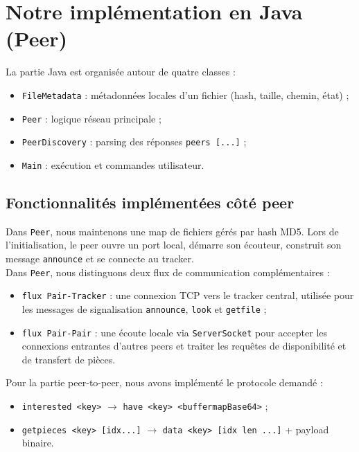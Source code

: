 \documentclass[12pt,a4paper]{article}
\begin{document}
\section{Notre implémentation en Java (Peer)}

La partie Java est organisée autour de quatre classes :
\begin{itemize}[leftmargin=1.2cm]
  \item \texttt{FileMetadata} : métadonnées locales d’un fichier (hash, taille, chemin, état) ;
  \item \texttt{Peer} : logique réseau principale ;
  \item \texttt{PeerDiscovery} : parsing des réponses \texttt{peers [...]} ;
  \item \texttt{Main} : exécution et commandes utilisateur.
\end{itemize}

\subsection{Fonctionnalités implémentées côté peer}

Dans \texttt{Peer}, nous maintenons une map de fichiers gérés par hash MD5. Lors de l’initialisation, le peer ouvre un port local, démarre son écouteur, construit son message \texttt{announce} et se connecte au tracker.\\

Dans \texttt{Peer}, nous distinguons deux flux de communication complémentaires :
\begin{itemize}[leftmargin=1.2cm]
  \item \texttt{flux Pair-Tracker} : une connexion TCP vers le tracker central, utilisée pour les messages de signalisation \texttt{announce}, \texttt{look} et \texttt{getfile} ;
  \item \texttt{flux Pair-Pair} : une écoute locale via \texttt{ServerSocket} pour accepter les connexions entrantes d'autres peers et traiter les requêtes de disponibilité et de transfert de pièces.
\end{itemize}

\vspace{0.5em}
Pour la partie peer-to-peer, nous avons implémenté le protocole demandé :
\begin{itemize}[leftmargin=1.2cm]
  \item \texttt{interested <key>} $\rightarrow$ \texttt{have <key> <buffermapBase64>} ;
  \item \texttt{getpieces <key> [idx...]} $\rightarrow$ \texttt{data <key> [idx len ...]} + payload binaire.
\end{itemize}
\end{document}
